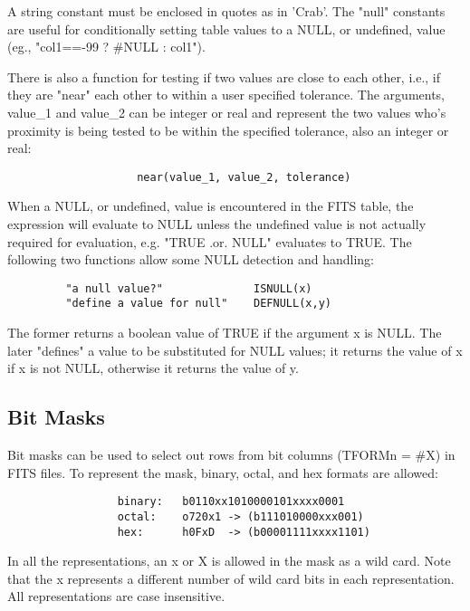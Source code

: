 \documentclass[11pt]{book}
\begin{document}
    A  string constant must  be enclosed  in quotes  as in  'Crab'.  The
    "null" constants  are useful for conditionally  setting table values
    to a NULL, or undefined, value (eg., "col1==-99 ? \#NULL : col1").

    There is also a function for testing if  two  values  are  close  to
    each  other,  i.e.,  if  they are "near" each other to within a user
    specified tolerance. The  arguments,  value\_1  and  value\_2  can  be
    integer  or  real  and  represent  the two values who's proximity is
    being tested to be within the specified tolerance, also  an  integer
    or real:

\begin{verbatim}
                    near(value_1, value_2, tolerance)
\end{verbatim}
    When  a  NULL, or undefined, value is encountered in the FITS table,
    the expression will evaluate to NULL unless the undefined  value  is
    not   actually   required  for  evaluation,  e.g. "TRUE  .or.  NULL"
    evaluates to TRUE. The  following  two  functions  allow  some  NULL
    detection  and  handling:

\begin{verbatim}
         "a null value?"              ISNULL(x)
         "define a value for null"    DEFNULL(x,y)
\end{verbatim}
    The former
    returns a boolean value of TRUE if the  argument  x  is  NULL.   The
    later  "defines"  a  value  to  be  substituted  for NULL values; it
    returns the value of x if x is not NULL, otherwise  it  returns  the
    value of y.




\subsection{Bit Masks}

    Bit  masks can be used to select out rows from bit columns (TFORMn =
    \#X) in FITS files. To represent the mask,  binary,  octal,  and  hex
    formats are allowed:


\begin{verbatim}
                 binary:   b0110xx1010000101xxxx0001
                 octal:    o720x1 -> (b111010000xxx001)
                 hex:      h0FxD  -> (b00001111xxxx1101)
\end{verbatim}

    In  all  the  representations, an x or X is allowed in the mask as a
    wild card. Note that the x represents a  different  number  of  wild
    card  bits  in  each  representation.  All  representations are case
    insensitive.
\end{document}
